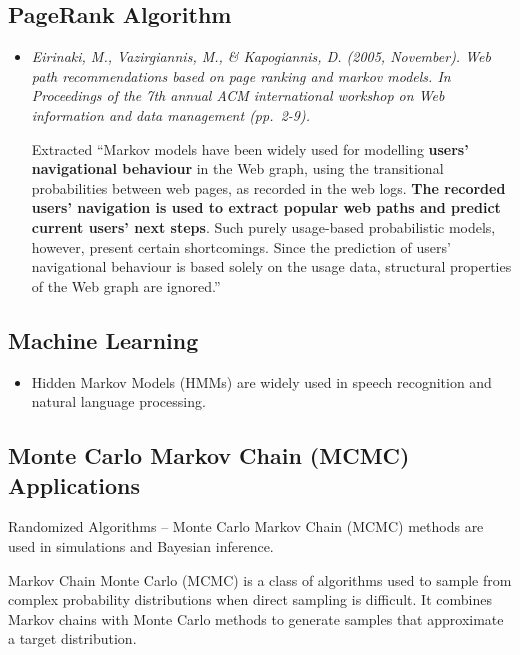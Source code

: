 \documentclass[
  letterpaper,
  DIV=11,
  numbers=noendperiod]{scrreprt}
\providecommand{\tightlist}{%
  \setlength{\itemsep}{0pt}\setlength{\parskip}{0pt}}\usepackage{longtable,booktabs,array}
\begin{document}
\subsection{PageRank Algorithm}\label{pagerank-algorithm}

\begin{itemize}
\item
  \emph{Eirinaki, M., Vazirgiannis, M., \& Kapogiannis, D. (2005,
  November). Web path recommendations based on page ranking and markov
  models. In Proceedings of the 7th annual ACM international workshop on
  Web information and data management (pp.~2-9).}

  Extracted ``Markov models have been widely used for modelling
  \textbf{users' navigational behaviour} in the Web graph, using the
  transitional probabilities between web pages, as recorded in the web
  logs. \textbf{The recorded users' navigation is used to extract
  popular web paths and predict current users' next steps}. Such purely
  usage-based probabilistic models, however, present certain
  shortcomings. Since the prediction of users' navigational behaviour is
  based solely on the usage data, structural properties of the Web graph
  are ignored.''
\end{itemize}

\subsection{Machine Learning}\label{machine-learning}

\begin{itemize}
\tightlist
\item
  Hidden Markov Models (HMMs) are widely used in speech recognition and
  natural language processing.
\end{itemize}

\subsection{Monte Carlo Markov Chain (MCMC)
Applications}\label{monte-carlo-markov-chain-mcmc-applications}

Randomized Algorithms -- Monte Carlo Markov Chain (MCMC) methods are
used in simulations and Bayesian inference.

Markov Chain Monte Carlo (MCMC) is a class of algorithms used to sample
from complex probability distributions when direct sampling is
difficult. It combines Markov chains with Monte Carlo methods to
generate samples that approximate a target distribution.
\end{document}
